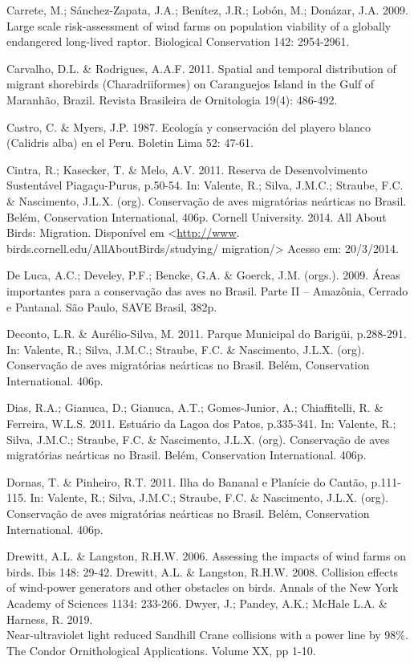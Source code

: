 \documentclass[
  oneside]{scrbook}
\begin{document}
Carrete, M.; Sánchez-Zapata, J.A.; Benítez, J.R.; Lobón, M.; Donázar, J.A. 2009. Large scale risk-assessment of wind farms on population viability of a globally endangered long-lived raptor. Biological Conservation 142: 2954-2961.

Carvalho, D.L. \& Rodrigues, A.A.F. 2011. Spatial and temporal distribution of migrant shorebirds (Charadriiformes) on Caranguejos Island in the Gulf of Maranhão, Brazil. Revista Brasileira de Ornitologia 19(4): 486-492.

Castro, C. \& Myers, J.P. 1987. Ecología y conservación del playero blanco (Calidris alba) en el Peru. Boletin Lima 52: 47-61.

Cintra, R.; Kasecker, T. \& Melo, A.V. 2011. Reserva de Desenvolvimento Sustentável Piagaçu-Purus, p.50-54. In: Valente, R.; Silva, J.M.C.; Straube, F.C. \& Nascimento, J.L.X. (org). Conservação de aves migratórias neárticas no Brasil. Belém, Conservation International, 406p.
Cornell University. 2014. All About Birds: Migration. Disponível em \textless{}\url{http://www}. birds.cornell.edu/AllAboutBirds/studying/ migration/\textgreater{} Acesso em: 20/3/2014.

De Luca, A.C.; Develey, P.F.; Bencke, G.A. \& Goerck, J.M. (orgs.). 2009. Áreas importantes para a conservação das aves no Brasil. Parte II -- Amazônia, Cerrado e Pantanal. São Paulo, SAVE Brasil, 382p.

Deconto, L.R. \& Aurélio-Silva, M. 2011. Parque Municipal do Barigüi, p.288-291. In: Valente, R.; Silva, J.M.C.; Straube, F.C. \& Nascimento, J.L.X. (org). Conservação de aves migratórias neárticas no Brasil. Belém, Conservation International. 406p.

Dias, R.A.; Gianuca, D.; Gianuca, A.T.; Gomes-Junior, A.; Chiaffitelli, R. \& Ferreira, W.L.S. 2011. Estuário da Lagoa dos Patos, p.335-341. In: Valente, R.; Silva, J.M.C.; Straube, F.C. \& Nascimento, J.L.X. (org). Conservação de aves migratórias neárticas no Brasil. Belém, Conservation International. 406p.

Dornas, T. \& Pinheiro, R.T. 2011. Ilha do Bananal e Planície do Cantão, p.111-115. In: Valente, R.; Silva, J.M.C.; Straube, F.C. \& Nascimento, J.L.X. (org). Conservação de aves migratórias neárticas no Brasil. Belém, Conservation International. 406p.

Drewitt, A.L. \& Langston, R.H.W. 2006. Assessing the impacts of wind farms on birds. Ibis 148: 29-42.
Drewitt, A.L. \& Langston, R.H.W. 2008. Collision effects of wind-power generators and other obstacles on birds. Annals of the New York Academy of Sciences 1134: 233-266.
Dwyer, J.; Pandey, A.K.; McHale L.A. \& Harness, R. 2019.\\
Near-ultraviolet light reduced Sandhill Crane collisions with a power line by 98\%. The Condor Ornithological Applications. Volume XX, pp 1-10.
\end{document}
